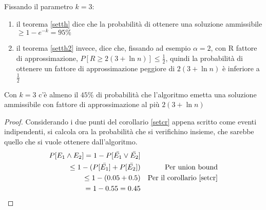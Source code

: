 \begin{corollary}
    \label{setcr}
    Fissando il parametro $k = 3$:
    \begin{enumerate}
        \item il teorema \ref{setth} dice che la probabilità di ottenere una soluzione ammissibile
        $\geq 1-e^{-k} = 95\%$
        \item il teorema \ref{setth2} invece, dice che, fissando ad esempio $\alpha=2$, con R fattore di 
        approssimazione,  $P[R \geq 2(3 + \ln n)] \leq \frac{1}{2}$, quindi la probabilità di ottenere un fattore
        di approssimazione peggiore di $2(3 + \ln n)$ è inferiore a $\frac{1}{2}$
    \end{enumerate}
\end{corollary}

\begin{corollary}
    Con $k = 3$ c'è almeno il $45\%$ di probabilità che l'algoritmo emetta una 
    soluzione ammissibile con fattore di approssimazione al più $2(3+\ln n)$
\end{corollary}
\begin{proof}
    Considerando i due punti del corollario \ref{setcr} appena scritto come eventi indipendenti, 
    si calcola ora la probabilità che si verifichino insieme, che sarebbe quello che si vuole 
    ottenere dall'algoritmo.
    \begin{equation}
        \begin{aligned}
            P[E_1 \wedge E_2] = 1 - P[\bar{E_1} \lor \bar{E_2}]\\
            \leq 1 - (P[\bar{E_1}] + P[\bar{E_2}]) && \text{Per union bound}\\
            \leq 1 - (0.05 + 0.5) && \text{Per il corollario \ref{setcr}}\\
            = 1 - 0.55 = 0.45
        \end{aligned}
    \end{equation}    
\end{proof}